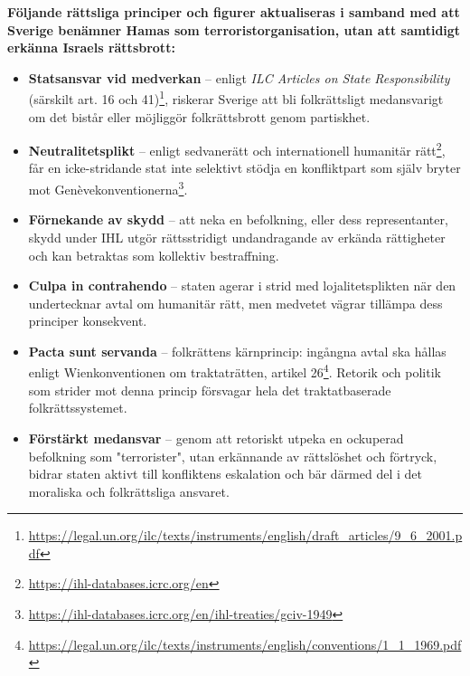 \begin{tcolorbox}[title=Rättsfigurer som aktualiseras vid terroristutpekning, colback=gray!10, colframe=black, sharp corners=south]
\textbf{Följande rättsliga principer och figurer aktualiseras i samband med att Sverige benämner Hamas som terroristorganisation, utan att samtidigt erkänna Israels rättsbrott:}

\begin{itemize}
    \item \textbf{Statsansvar vid medverkan} – enligt \textit{ILC Articles on State Responsibility} (särskilt art. 16 och 41)\footnote{\url{https://legal.un.org/ilc/texts/instruments/english/draft_articles/9_6_2001.pdf}}, riskerar Sverige att bli folkrättsligt medansvarigt om det bistår eller möjliggör folkrättsbrott genom partiskhet.
    
    \item \textbf{Neutralitetsplikt} – enligt sedvanerätt och internationell humanitär rätt\footnote{\url{https://ihl-databases.icrc.org/en}}, får en icke-stridande stat inte selektivt stödja en konfliktpart som själv bryter mot Genèvekonventionerna\footnote{\url{https://ihl-databases.icrc.org/en/ihl-treaties/gciv-1949}}.
    
    \item \textbf{Förnekande av skydd} – att neka en befolkning, eller dess representanter, skydd under IHL utgör rättsstridigt undandragande av erkända rättigheter och kan betraktas som kollektiv bestraffning.
    
    \item \textbf{Culpa in contrahendo} – staten agerar i strid med lojalitetsplikten när den undertecknar avtal om humanitär rätt, men medvetet vägrar tillämpa dess principer konsekvent.
    
    \item \textbf{Pacta sunt servanda} – folkrättens kärnprincip: ingångna avtal ska hållas enligt Wienkonventionen om traktaträtten, artikel 26\footnote{\url{https://legal.un.org/ilc/texts/instruments/english/conventions/1_1_1969.pdf}}. Retorik och politik som strider mot denna princip försvagar hela det traktatbaserade folkrättssystemet.
    
    \item \textbf{Förstärkt medansvar} – genom att retoriskt utpeka en ockuperad befolkning som "terrorister", utan erkännande av rättslöshet och förtryck, bidrar staten aktivt till konfliktens eskalation och bär därmed del i det moraliska och folkrättsliga ansvaret.
\end{itemize}
\end{tcolorbox}

